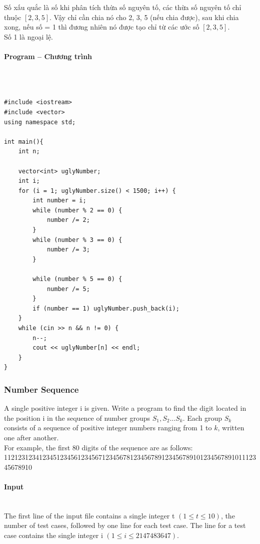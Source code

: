 \documentclass{article}
\begin{document}
Số xấu quắc là số khi phân tích thừa số nguyên tố, các thừa số nguyên tố chỉ thuộc $[2,3,5]$. Vậy chỉ cần chia nó cho 2, 3, 5 (nếu chia được), sau khi chia xong, nếu số = 1 thì đương nhiên nó được tạo chỉ từ các ước số $[2,3,5]$. \\

Số 1 là ngoại lệ.

\paragraph{Program -- Chương trình} \mbox{} \\


\begin{lstlisting}

#include <iostream>
#include <vector>
using namespace std;

int main(){
	int n;

	vector<int> uglyNumber;
	int i;
	for (i = 1; uglyNumber.size() < 1500; i++) {
		int number = i;
		while (number % 2 == 0) {
			number /= 2;
		}
		while (number % 3 == 0) {
			number /= 3;
		}

		while (number % 5 == 0) {
			number /= 5;
		}
		if (number == 1) uglyNumber.push_back(i);
	}
	while (cin >> n && n != 0) {
		n--;
		cout << uglyNumber[n] << endl;
	}
}
\end{lstlisting}


\subsubsection{Number Sequence}

A single positive integer i is given. Write a program to find the digit located in the position i in the sequence of number groups $S_1,S_2 …S_k$. Each group $S_k$ consists of a sequence of positive integer numbers ranging from 1 to $k$, written one after another.\\
For example, the first 80 digits of the sequence are as follows: \\
11212312341234512345612345671234567812345678912345678910123456789101112345678910
\paragraph{Input} \mbox{} \\

The first line of the input file contains a single integer t $(1 \leq t \leq 10)$, the number of test cases, followed by one line for each test case. The line for a test case contains the single integer i $(1 \leq i \leq 2147483647)$.
\end{document}
